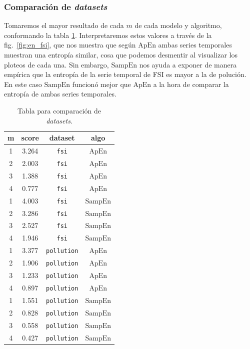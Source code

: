 \documentclass[a4paper,12pt]{article}
\begin{document}
\subsubsection{Comparación de \textit{datasets}}
Tomaremos el mayor resultado de cada $m$ de cada modelo y algoritmo, conformando la tabla \ref{tab:dataset_comparison}. Interpretaremos estos valores a través de la fig.~\ref{fig:en_fsi}, que nos muestra que según $\textrm{ApEn}$ ambas series temporales muestran una entropía similar, cosa que podemos desmentir al visualizar los ploteos de cada una. Sin embargo, $\textrm{SampEn}$ nos ayuda a exponer de manera empírica que la entropía de la serie temporal de FSI es mayor a la de polución. En este caso $\textrm{SampEn}$ funcionó mejor que $\textrm{ApEn}$ a la hora de comparar la entropía de ambas series temporales.

\begin{table}[H]
\centering
\begin{tabular}{cccc}
\hline
\textbf{m} & \textbf{score} & \textbf{dataset} & \textbf{algo} \\ \hline
1          & 3.264          & \texttt{fsi}              & $\textrm{ApEn}$          \\
2          & 2.003          & \texttt{fsi}              & $\textrm{ApEn}$          \\
3          & 1.388          & \texttt{fsi}              & $\textrm{ApEn}$          \\
4          & 0.777          & \texttt{fsi}              & $\textrm{ApEn}$          \\
1          & 4.003          & \texttt{fsi}              & $\textrm{SampEn}$        \\
2          & 3.286          & \texttt{fsi}              & $\textrm{SampEn}$        \\
3          & 2.527          & \texttt{fsi}              & $\textrm{SampEn}$        \\
4          & 1.946          & \texttt{fsi}              & $\textrm{SampEn}$        \\
1          & 3.377          & \texttt{pollution}        & $\textrm{ApEn}$          \\
2          & 1.906          & \texttt{pollution}        & $\textrm{ApEn}$          \\
3          & 1.233          & \texttt{pollution}        & $\textrm{ApEn}$          \\
4          & 0.897          & \texttt{pollution}        & $\textrm{ApEn}$          \\
1          & 1.551          & \texttt{pollution}        & $\textrm{SampEn}$        \\
2          & 0.828          & \texttt{pollution}        & $\textrm{SampEn}$        \\
3          & 0.558          & \texttt{pollution}        & $\textrm{SampEn}$        \\
4          & 0.427          & \texttt{pollution}        & $\textrm{SampEn}$        \\ \hline
\end{tabular}
\caption{Tabla para comparación de \textit{datasets}.}
\label{tab:dataset_comparison}
\end{table}
\end{document}
